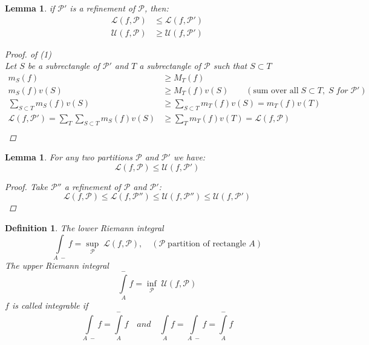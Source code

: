\documentclass[12pt]{article}
\newtheorem{lemma}[theorem]{Lemma}
\newtheorem{definition}{Definition}[section]
\begin{document}
\begin{lemma}
if $\mathcal{P}'$ is a refinement of $\mathcal{P}$, then:
\begin{align}
\mathcal{L}(f,\mathcal{P}) &\leq \mathcal{L}(f,\mathcal{P}')\\
\mathcal{U}(f,\mathcal{P}) &\geq \mathcal{U}(f,\mathcal{P}') 
\end{align}

\begin{proof} of (1)\\
Let $S$ be a subrectangle of $\mathcal{P}'$ and $T$ a subrectangle of $\mathcal{P}$ such that $S\subset T$ 
\begin{align*}
m_S(f) & \geq M_T(f) \\
m_S(f)v(S) &\geq M_T(f)v(S) \qquad ( \text{sum over all} \; S \subset T, \; S \; for \; \mathcal{P}')\\
\sum_{S \subset T}m_S(f)v(S) &\geq \sum_{S \subset T}m_T(f)v(S) = m_T(f)v(T)\\
\mathcal{L}(f,\mathcal{P}') = \sum_{T}\sum_{S \subset T}m_S(f)v(S) &\geq \sum_{T} m_T(f)v(T) = \mathcal{L}(f,\mathcal{P})\\
\end{align*}
\end{proof}
\end{lemma}

\begin{lemma}
For any two partitions $\mathcal{P}$ and $\mathcal{P}'$ we have:
 \[\mathcal{L}(f,\mathcal{P}) \leq \mathcal{U}(f,\mathcal{P}')\]
\begin{proof}
Take $\mathcal{P}''$ a refinement of $\mathcal{P}$ and $\mathcal{P}'$:
\[\mathcal{L}(f,\mathcal{P}) \leq\mathcal{L}(f,\mathcal{P}'') \leq \mathcal{U}(f,\mathcal{P}'') \leq  \mathcal{U}(f,\mathcal{P}')\]
\end{proof}
\end{lemma}

\begin{definition}
The lower Riemann integral \[\int\limits_{A \;-}f = \sup_{\mathcal{P}} \;\mathcal{L}(f, \mathcal{P}) , \quad (\mathcal{P}\; \text{partition of rectangle $A$})\]
The upper Riemann integral \[\int\limits_{A}^{-}f = \inf_{\mathcal{P}} \;\mathcal{U}(f, \mathcal{P})\]
$f$ is called integrable if 
\[ \int\limits_{A\;-}f = \int\limits_{A}^{-}f \quad and \quad \int\limits_{A} f = \int\limits_{A \;-}f = \int\limits_{A}^{-}f\] 
\end{definition}
\end{document}
